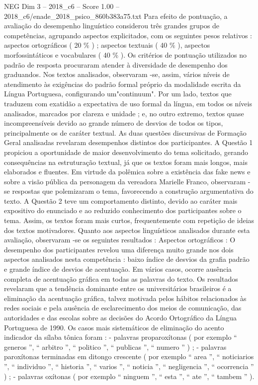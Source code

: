 \begin{textsample}{NEG Dim 3 – 2018\_c6 – Score 1.00 – 2018\_c6/enade\_2018\_psico\_860b383a75.txt}
Para efeito de pontuação, a avaliação do desempenho linguístico considerou três grandes grupos de competências, agrupando aspectos explicitados, com os seguintes pesos relativos : aspectos ortográficos ( 20 \% ) ; aspectos textuais ( 40 \% ), aspectos morfossintáticos e vocabulares ( 40 \% ).
Os critérios de pontuação utilizados no padrão de resposta procuraram atender à diversidade de desempenho dos graduandos.
Nos textos analisados, observaram -se, assim, vários níveis de atendimento às exigências do padrão formal próprio da modalidade escrita da Língua Portuguesa, configurando um"continuum".
Por um lado, textos que traduzem com exatidão a expectativa de uso formal da língua, em todos os níveis analisados, marcados por clareza e unidade ; e, no outro extremo, textos quase incompreensíveis devido ao grande número de desvios de todos os tipos, principalmente os de caráter textual.
As duas questões discursivas de Formação Geral analisadas revelaram desempenhos distintos dos participantes.
A Questão 1 propiciou a oportunidade de maior desenvolvimento do tema solicitado, gerando consequências na estruturação textual, já que os textos foram mais longos, mais elaborados e fluentes.
Em virtude da polêmica sobre a existência das fake news e sobre a visão pública da personagem da vereadora Marielle Franco, observaram -se respostas que polemizaram o tema, favorecendo a construção argumentativa do texto.
A Questão 2 teve um comportamento distinto, devido ao caráter mais expositivo do enunciado e ao reduzido conhecimento dos participantes sobre o tema.
Assim, os textos foram mais curtos, frequentemente com repetição de ideias dos textos motivadores.
Quanto aos aspectos linguísticos analisados durante esta avaliação, observaram -se os seguintes resultados : Aspectos ortográficos : O desempenho dos participantes revelou uma diferença muito grande nos dois aspectos analisados nesta competência : baixo índice de desvios da grafia padrão e grande índice de desvios de acentuação.
Em vários casos, ocorre ausência completa de acentuação gráfica em todas as palavras do texto.
Os resultados revelaram que a tendência dominante entre os universitários brasileiros é a eliminação da acentuação gráfica, talvez motivada pelos hábitos relacionados às redes sociais e pela ausência de esclarecimento dos meios de comunicação, das autoridades e das escolas sobre as decisões do Acordo Ortográfico da Língua Portuguesa de 1990.
Os casos mais sistemáticos de eliminação do acento indicador da sílaba tônica foram : - palavras proparoxítonas ( por exemplo “ generos ”, “ arbitro ”, “ politico ”, “ publicas ”, “ numero ” ) ; - palavras paroxítonas terminadas em ditongo crescente ( por exemplo “ area ”, “ noticiarios ”, “ individuo ”, “ historia ”, “ varios ”, “ noticia ”, “ negligencia ”, “ ocorrencia ” ) ; - palavras oxítonas ( por exemplo “ ninguem ”, “ esta ”, “ ate ”, “ tambem ” ).

\end{textsample}
